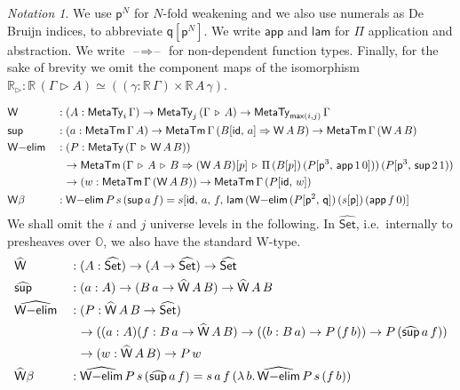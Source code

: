 \documentclass[acmsmall,screen]{acmart}
\newcommand{\mit}[1]{{\mathsf{#1}}}
\newcommand{\msf}[1]{{\mathsf{#1}}}
\newcommand{\mbb}[1]{\mathbb{#1}}
\newcommand{\p}{\mathsf{p}}
\newcommand{\q}{\mathsf{q}}
\newcommand{\wh}[1]{\widehat{#1}}
\newcommand{\whset}{\wh{\Set}}
\newcommand{\re}{\mbb{R}}
\newcommand{\mbbo}{\mbb{O}}
\newcommand{\vW}{\mathsf{W}}
\newcommand{\vsup}{\mathsf{sup}}
\newcommand{\vid}{\mathsf{id}}
\newcommand{\Set}{\msf{Set}}
\newcommand{\ext}{\triangleright}
\newcommand{\MTy}{\msf{MetaTy}}
\newcommand{\MTm}{\msf{MetaTm}}
\newcommand{\blank}{{\mathord{\hspace{1pt}\text{--}\hspace{1pt}}}}
\theoremstyle{remark}
\newtheorem{notation}{Notation}
\newcommand{\id}{\mit{id}}
\begin{document}
\begin{notation} We use $\p^N$ for $N$-fold
weakening and we also use numerals as De Bruijn indices, to abbreviate
$\q[\p^N]$. We write $\msf{app}$ and $\msf{lam}$ for $\Pi$ application and
abstraction. We write $\blank{\Rightarrow}\blank$ for non-dependent function
types. Finally, for the sake of brevity we omit the component maps of the isomorphism
$\re_\ext : \re\,(\Gamma \ext A) \simeq ((\gamma : \re\,\Gamma) \times \re\,A\,\gamma)$.
\end{notation}
\begin{alignat*}{3}
  &\vW   &&: (A : \MTy_i\,\Gamma) \to \MTy_j\,(\Gamma\,\ext\,A) \to \MTy_{\msf{max}(i,j)}\,\Gamma\\
  &\vsup &&: (a : \MTm\,\Gamma\,A) \to \MTm\,\Gamma\,(B[\vid,\,a] \Rightarrow \vW\,A\,B) \to \MTm\,\Gamma\,(\vW\,A\,B)\\
  &\vW{-}\msf{elim}  &&: (P : \MTy\,(\Gamma\,\ext\,\vW\,A\,B))\\
  &                  && \hspace{0.6em}\to \MTm\,(\Gamma\,\ext\,A\,\ext\,B \Rightarrow (\vW\,A\,B)[p]\,\ext\,\Pi\,(B[p])\,(P[\p^3,\,\msf{app}\,1\,0]))\,(P[\p^3,\,\vsup\,2\,1))\\
  &                  && \hspace{0.6em}\to (w : \MTm\,\Gamma\,(\vW\,A\,B)) \to \MTm\,\Gamma\,(P[\id,\,w])\\
  & \vW{\beta}       &&:
    \vW{-}\msf{elim}\,P\,s\,(\vsup\,a\,f) = s[\id,\,a,\,f,\,\msf{lam}\,(\vW{-}\msf{elim}\,(P[\p^2,\,\q])\,(s[\p])\,(\msf{app}\,f\,0)]
\end{alignat*}
We shall omit the $i$ and $j$ universe levels in the following. In $\whset$,
i.e.\ internally to presheaves over $\mbbo$, we also have the standard W-type.
\begin{alignat*}{3}
  & \wh{\vW}   &&: (A : \whset) \to (A \to \whset) \to \whset\\
  & \wh{\vsup} &&: (a : A) \to (B\,a \to \wh{\vW}\,A\,B) \to \wh{\vW}\,A\,B\\
  & \wh{\vW{-}\msf{elim}} &&: (P : \wh{\vW}\,A\,B \to \whset)\\
  & && \hspace{0.6em}\to ((a : A)(f : B\,a \to \wh{\vW}\,A\,B) \to ((b : B\,a) \to P\,(f\,b)) \to P\,(\wh{\vsup}\,a\,f))\\
  & && \hspace{0.6em}\to (w : \wh{\vW}\,A\,B) \to P\,w\\
  & \wh{\vW}{\beta} &&: \wh{\vW{-}\msf{elim}}\,P\,s\,(\wh{\vsup}\,a\,f) = s\,a\,f\,(\lambda\,b.\,\wh{\vW{-}\msf{elim}}\,P\,s\,(f\,b))
\end{alignat*}
\end{document}
